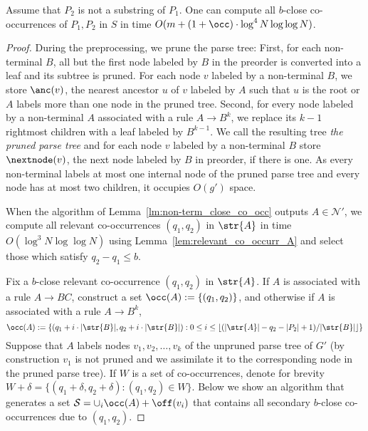 \begin{lemma}
\label{lem:close_co_occurr}
Assume that $P_2$ is not a substring of $P_1$. One can compute all $b$-close co-occurrences of $P_1, P_2$  in $S$ in time $O(m + (1+\occ) \cdot \log^{4} N \log\log N)$. 
\end{lemma}
\begin{proof}
During the preprocessing, we prune the parse tree: First, for each non-terminal $B$, all but the first node labeled by $B$ in the preorder is converted into a leaf and its subtree is pruned. For each node $v$ labeled by a non-terminal $B$, we store $\anc(v)$, the nearest ancestor $u$ of $v$ labeled by $A$ such that $u$ is the root or $A$ labels more than one node in the pruned tree. Second, for every node labeled by a non-terminal $A$ associated with a rule $A \rightarrow B^k$, we replace its $k-1$ rightmost children with a leaf labeled by $B^{k-1}$. We call the resulting tree \emph{the pruned parse tree} and for each node $v$ labeled by a non-terminal $B$ store $\nextnode(v)$, the next node labeled by $B$ in preorder, if there is one. As every non-terminal labels at most one internal node of the pruned parse tree and every node has at most two children, it occupies $O(g')$ space.

When the algorithm of Lemma~\ref{lm:non-term_close_co_occ} outputs $A \in \mathcal{N}'$, we compute all relevant co-occurrences $(q_1,q_2)$ in $\str{A}$ in time $O(\log^{3} N\log \log N)$ using Lemma~\ref{lem:relevant_co_occurr_A} and select those which satisfy $q_2-q_1 \leq b$.

Fix a $b$-close relevant co-occurrence $(q_1,q_2)$ in $\str{A}$. If $A$ is associated with a rule $A \rightarrow BC$, construct a set $\occ(A) := \{(q_1,q_2)\}$, and otherwise if $A$ is associated with a rule $A \rightarrow B^k$,
$$\occ(A) := \{(q_1+i \cdot |\str{B}|, q_2+i \cdot |\str{B}|) : 0 \le i \le \lfloor (|\str{A}|-q_2-|P_2|+1)/|\str{B}| \rfloor\}$$
Suppose that $A$ labels nodes $v_1, v_2, \ldots, v_k$ of the unpruned parse tree of $G'$ (by construction $v_1$ is not pruned and we assimilate it to the corresponding node in the pruned parse tree). If $W$ is a set of co-occurrences, denote for brevity $W+\delta = \{(q_1+\delta,q_2+\delta) : (q_1,q_2) \in W\}$. Below we show an algorithm that generates a set $\mathcal{S} = \cup_i \occ(A) + \off(v_i)$ that contains all secondary $b$-close co-occurrences due to $(q_1,q_2)$.  


\end{proof}
